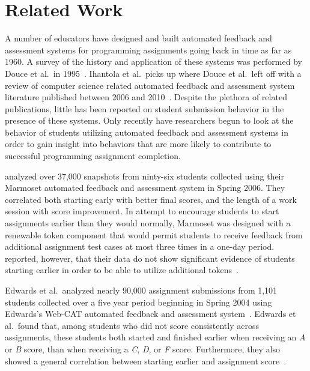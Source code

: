 \section{Related Work}

A number of educators have designed and built automated feedback and assessment
systems for programming assignments going back in time as far as 1960. A survey
of the history and application of these systems was performed by Douce et
al.\ in 1995~\cite{Douce:2005:ATA:1163405.1163409}. Ihantola et al.\ picks up
where Douce et al.\ left off with a review of computer science related
automated feedback and assessment system literature published between 2006 and
2010~\cite{Ihantola:2010:RRS:1930464.1930480}. Despite the plethora of related
publications, little has been reported on student submission behavior in the
presence of these systems. Only recently have researchers begun to look at the
behavior of students utilizing automated feedback and assessment systems in
order to gain insight into behaviors that are more likely to contribute to
successful programming assignment completion.

\spacco{} analyzed over 37,000 snapshots from ninty-six students collected
using their Marmoset automated feedback and assessment system in Spring
2006. They correlated both starting early with better final scores, and the
length of a work session with score improvement. In attempt to encourage
students to start assignments earlier than they would normally, Marmoset was
designed with a renewable token component that would permit students to receive
feedback from additional assignment test cases at most three times in a one-day
period. \spacco{} reported, however, that their data do not show significant
evidence of students starting earlier in order to be able to utilize additional
tokens~\cite{Spacco:2013:TIP:2462476.2465594, Spacco:2006:EMD:1140124.1140131}.

Edwards et al.\ analyzed nearly 90,000 assignment submissions from 1,101
students collected over a five year period beginning in Spring 2004 using
Edwards's Web-CAT automated feedback and assessment
system~\cite{Edwards:2003:RCS:949344.949390}. Edwards et al.\ found that, among
students who did not score consistently across assignments, these students both
started and finished earlier when receiving an \emph{A} or \emph{B} score, than
when receiving a \emph{C}, \emph{D}, or \emph{F} score. Furthermore, they also
showed a general correlation between starting earlier and assignment
score~\cite{Edwards:2009:CEI:1584322.1584325}.

